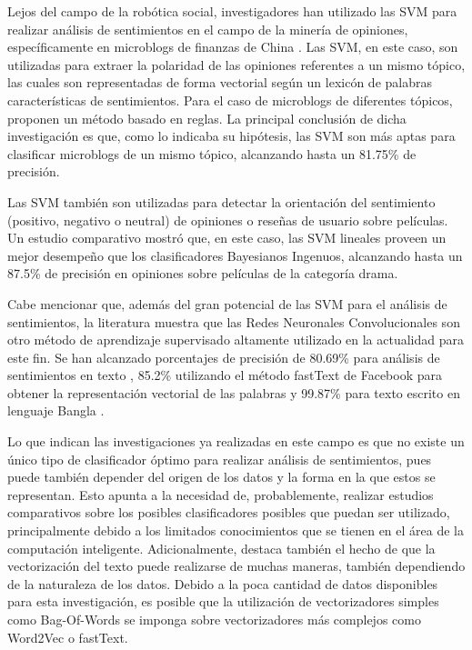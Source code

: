 \documentclass[conference]{IEEEtran}
\begin{document}
    Lejos del campo de la robótica social, investigadores han utilizado las SVM para realizar análisis de sentimientos en el campo de la minería de opiniones, específicamente en microblogs de finanzas de China \cite{yan2018sentiment}. Las SVM, en este caso, son utilizadas para extraer la polaridad de las opiniones referentes a un mismo tópico, las cuales son representadas de forma vectorial según un lexicón de palabras características de sentimientos. Para el caso de microblogs de diferentes tópicos, proponen un método basado en reglas. La principal conclusión de dicha investigación es que, como lo indicaba su hipótesis, las SVM son más aptas para clasificar microblogs de un mismo tópico, alcanzando hasta un 81.75\% de precisión.

    Las SVM también son utilizadas para detectar la orientación del sentimiento (positivo, negativo o neutral) de opiniones o reseñas de usuario sobre películas. Un estudio comparativo mostró que, en este caso, las SVM lineales proveen un mejor desempeño que los clasificadores Bayesianos Ingenuos, alcanzando hasta un 87.5\% de precisión \cite{rana2016comparative} en opiniones sobre películas de la categoría drama.
    
    Cabe mencionar que, además del gran potencial de las SVM para el análisis de sentimientos, la literatura muestra que las Redes Neuronales Convolucionales son otro método de aprendizaje supervisado altamente utilizado en la actualidad para este fin. Se han alcanzado porcentajes de precisión de 80.69\% para análisis de sentimientos en texto \cite{chachra2017sentiment}, 85.2\% utilizando el método fastText de Facebook para obtener la representación vectorial de las palabras \cite{santos2017sentiment} y 99.87\% para texto escrito en lenguaje Bangla \cite{alam2017sentiment}.
    
    Lo que indican las investigaciones ya realizadas en este campo es que no existe un único tipo de clasificador óptimo para realizar análisis de sentimientos, pues puede también depender del origen de los datos y la forma en la que estos se representan. Esto apunta a la necesidad de, probablemente, realizar estudios comparativos sobre los posibles clasificadores posibles que puedan ser utilizado, principalmente debido a los limitados conocimientos que se tienen en el área de la computación inteligente. Adicionalmente, destaca también el hecho de que la vectorización del texto puede realizarse de muchas maneras, también dependiendo de la naturaleza de los datos. Debido a la poca cantidad de datos disponibles para esta investigación, es posible que la utilización de vectorizadores simples como Bag-Of-Words se imponga sobre vectorizadores más complejos como Word2Vec o fastText.
    
\end{document}
